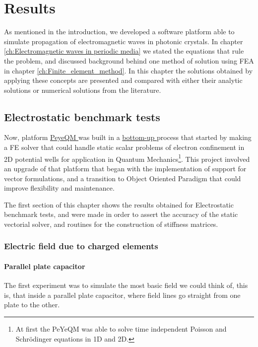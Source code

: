 \chapter{Results}
\label{ch:Results}
As mentioned in the introduction, we developed a software platform able to simulate propagation of electromagnetic waves in photonic crystals. In chapter \ref{ch:Electromagnetic waves in periodic media} we stated the equations that rule the problem, and discussed background behind one method of solution using FEA in chapter \ref{ch:Finite_element_method}. In this chapter the solutions obtained by applying these concepts are presented and compared with either their analytic solutions or numerical solutions from the literature.

\section{Electrostatic benchmark tests}

Now, platform \href{https://github.com/bebopsan/peyeQM}{PeyeQM } was built in a \href{https://en.wikipedia.org/wiki/Top-down_and_bottom-up_design}{bottom-up } process that started by making a FE solver that could handle static scalar problems of electron confinement in 2D potential wells for application in Quantum Mechanics\footnote{At first the PeYeQM was able to solve time independent Poisson and Schrödinger equations in 1D and 2D.}. This project involved an upgrade of that platform that began with the implementation of support for vector formulations, and a transition to Object Oriented Paradigm that could improve flexibility and maintenance.

The first section of this chapter shows the results obtained for Electrostatic benchmark tests, and were made in order to assert the accuracy of the static vectorial solver, and  routines for the construction of stiffness matrices.

\subsection{Electric field due to charged elements}
\subsubsection{Parallel plate capacitor}
The first experiment was to simulate the most basic field we could think of, this is, that inside a parallel plate capacitor, where field lines go straight from one plate to the other. 

